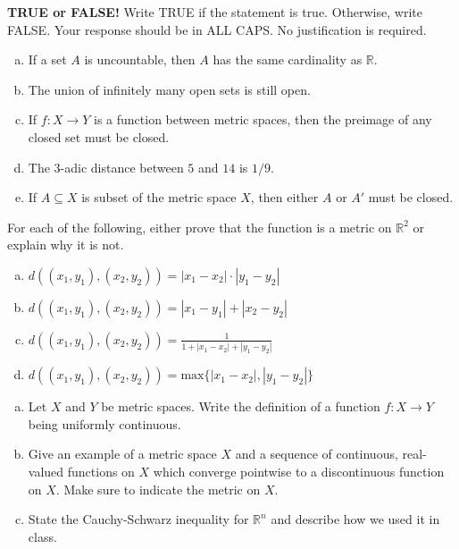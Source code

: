 \documentclass[11pt]{exam}
\theoremstyle{definition}
\begin{document}
\begin{questions}

\addpoints

\question[10]\mbox{}
\textbf{TRUE or FALSE!}  Write  TRUE if the statement is true.  Otherwise, write FALSE.  Your response should be in ALL CAPS.  No justification is required.
\begin{enumerate}[(a)]
\item  If a set $A$ is uncountable, then $A$ has the same cardinality as $\mathbb R$.
\vspace{1.2in}
\item  The union of infinitely many open sets is still open.
\vspace{1.2in}
\item  If $f: X\rightarrow Y$ is a function between metric spaces, then the preimage of any closed set must be closed.
\vspace{1.2in}
\item  The $3$-adic distance between $5$ and $14$ is $1/9$.
\vspace{1.2in}
\item  If $A\subseteq X$ is subset of the metric space $X$, then either $A$ or $A'$ must be closed.
\vspace{1.2in}
\end{enumerate}

\newpage
\question[10]\mbox{} 
For each of the following, either prove that the function is a metric on $\mathbb R^2$ or explain why it is not.
\begin{enumerate}[(a)]
\item  $d((x_1,y_1),(x_2,y_2)) = |x_1-x_2|\cdot |y_1-y_2|$
\vspace{1.5in}
\item  $d((x_1,y_1),(x_2,y_2)) = |x_1-y_1| + |x_2-y_2|$
\vspace{1.5in}
\item  $d((x_1,y_1),(x_2,y_2)) = \frac{1}{1 + |x_1-x_2| + |y_1-y_2|}$
\vspace{1.5in}
\item  $d((x_1,y_1),(x_2,y_2)) = \text{max}\{|x_1-x_2|,|y_1-y_2|\}$
\end{enumerate}

\newpage
\question[10]\mbox{} %
\begin{enumerate}[(a)]
\item  Let $X$ and $Y$ be metric spaces.  Write the definition of a function $f: X\rightarrow Y$ being uniformly continuous.
\vspace{2in}
\item  Give an example of a metric space $X$ and a sequence of continuous, real-valued functions on $X$ which converge pointwise to a discontinuous function on $X$.  Make sure to indicate the metric on $X$.
\vspace{2.0in}
\item  State the Cauchy-Schwarz inequality for $\mathbb R^n$ and describe how we used it in class.
\end{enumerate}


\end{questions}
\end{document}
